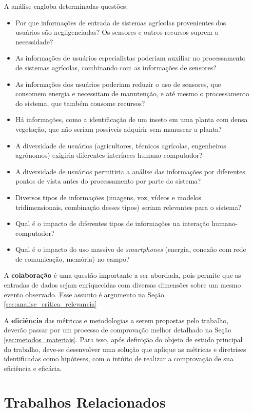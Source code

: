 \documentclass[12pt]{article}
\begin{document}
A análise engloba determinadas questões:
\begin{itemize}
	\item Por que informações de entrada de sistemas agrícolas provenientes dos usuários são negligenciadas? Os sensores e outros recursos suprem a necessidade?
	\item As informações de usuários especialistas poderiam auxiliar no processamento de sistemas agrícolas, combinando com as informações de sensores?
	\item As informações dos usuários poderiam reduzir o uso de sensores, que consomem energia e necessitam de manutenção, e até mesmo o processamento do sistema, que também consome recursos?
	\item Há informações, como a identificação de um inseto em uma planta com densa vegetação, que não seriam possíveis adquirir sem manusear a planta?
	\item A diversidade de usuários (agricultores, técnicos agrícolas, engenheiros agrônomos) exigiria diferentes interfaces humano-computador?
	\item A diversidade de usuários permitiria a análise das informações por diferentes pontos de vista antes do processamento por parte do sistema?
	\item Diversos tipos de informações (imagens, voz, vídeos e modelos tridimensionais, combinação desses tipos) seriam relevantes para o sistema?
	\item Qual é o impacto de diferentes tipos de informações na interação humano-computador?
	\item Qual é o impacto do uso massivo de \textit{smartphones} (energia, conexão com rede de comunicação, memória) no campo?
\end{itemize}

A \textbf{colaboração} é uma questão importante a ser abordada, pois permite que as entradas de dados sejam enriquecidas com diversas dimensões sobre um mesmo evento observado. Esse assunto é argumento na Seção \ref{sec:analise_critica_relevancia}

A \textbf{eficiência} das métricas e metodologias a serem propostas pelo trabalho, deverão passar por um processo de comprovação melhor detalhado na Seção \ref{sec:metodos_materiais}. Para isso, após definição do objeto de estudo principal do trabalho, deve-se desenvolver uma solução que aplique as métricas e diretrises identificadas como hipóteses, com o intúito de realizar a comprovação de sua eficiência e eficácia.

\section{Trabalhos Relacionados}
\label{sec:trabalhos_relacionados}
\end{document}
